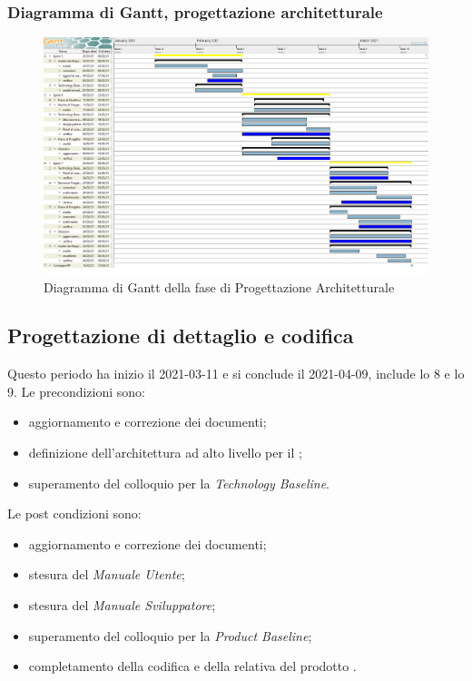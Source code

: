 \subsubsection{Diagramma di Gantt, progettazione architetturale}
\begin{figure}[H]
    \centering
    \includegraphics[scale = 0.8]{components/img/progettazione_architetturale.png}
    \caption{Diagramma di Gantt della fase di Progettazione Architetturale}
    \label{fig:Diagramma di Gantt, fase di progettazione architetturale}
\end{figure}

\newpage
\subsection{Progettazione di dettaglio e codifica}
Questo periodo ha inizio il 2021-03-11 e si conclude il 2021-04-09, include lo  8 e lo  9.
Le precondizioni sono:
\begin{itemize}
	\item aggiornamento e correzione dei documenti;
	\item definizione dell'architettura ad alto livello per il ;
	\item  superamento del colloquio per la \textit{Technology Baseline}.
\end{itemize}
Le post condizioni sono:
\begin{itemize}
	\item aggiornamento e correzione dei documenti;
	\item stesura del \textit{Manuale Utente};
	\item stesura del \textit{Manuale Sviluppatore};
	\item superamento del colloquio per la \textit{Product Baseline};
	\item completamento della codifica e della relativa  del prodotto .
\end{itemize}
